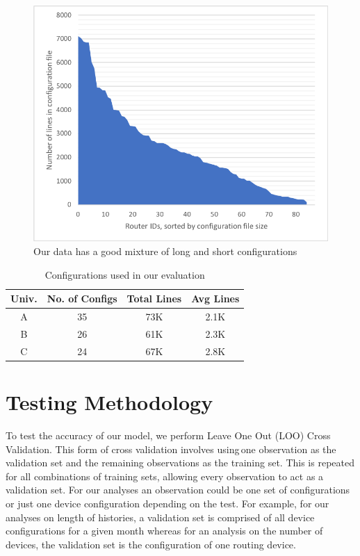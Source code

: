 \documentclass[../thesis.tex]{subfiles}
\begin{document}
\begin{figure}[H]
	\centering
	\includegraphics[width=5in]{config_sizes.png}
	\caption{Our data has a good mixture of long and short configurations}
	\label{fig:configs}
\end{figure}

\begin{table}
    \small \centering
    \begin{tabular}{ | c | c | c | c |}
    \hline
        {\bf Univ.} & {\bf No. of Configs} & {\bf Total Lines} & {\bf Avg
    Lines} \\ 
    \hline
    A & 35 & 73K & 2.1K \\ 
    B & 26 & 61K & 2.3K \\ 
    C & 24 & 67K & 2.8K \\ 
    \hline
    \end{tabular}
    \caption{Configurations used in our evaluation}
    \vspace{-1em}
    \label{tab:datasets}
\end{table}


\section{Testing Methodology}

To test the accuracy of our model, we perform Leave One Out (LOO) Cross Validation. This form of cross validation involves using one observation as the validation set and the remaining observations as the training set. This is repeated for all combinations of training sets, allowing every observation to act as a validation set. For our analyses an observation could be one set of configurations or just one device configuration depending on the test. For example, for our analyses on length of histories, a validation set is comprised of all device configurations for a given month whereas for an analysis on the number of devices, the validation set is the configuration of one routing device.\\
\end{document}
